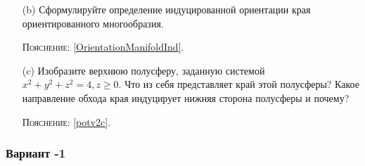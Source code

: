 \documentclass[a5paper]{article}
\theoremstyle{plain}
\theoremstyle{definition}
\numberwithin{through}{section}
\numberwithin{equation}{section}
\begin{document}
\begin{enumerate}
\begin{itemize}
		\item[(b)]
		Сформулируйте определение индуцированной ориентации края
		ориентированного многообразия.
		
		\textsc{Пояснение:} \ref{OrientationManifoldInd}.
		
		\item[(c)]
		Изобразите верхнюю полусферу, заданную системой
		$x^2 + y^2 + z^2 = 4, z \geq 0$. Что из себя представляет край этой полусферы?
		Какое направление обхода края индуцирует нижняя сторона
		полусферы и почему?
		
		\textsc{Пояснение:} \ref{potv2c}.
	\end{itemize}
\end{enumerate}

\newpage
\subsubsection{Вариант -1}
\end{document}
